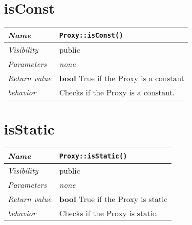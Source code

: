  \section{isConst}
\begin{longtable}{p{3cm} @{\hskip 1cm} p{12cm}}
 \hline
\textit{Name} & \texttt{Proxy::isConst()}\\
\hline
 \textit{Visibility} & public\\
\hline
\textit{Parameters} & \textit{none}\\
\hline
\textit{Return value} & \textbf{ bool} True if the Proxy is a constant \\
  \hline
 \textit{behavior} & Checks if the Proxy is a constant. \\
\hline
\end{longtable} \pagebreak
 \section{isStatic}
\begin{longtable}{p{3cm} @{\hskip 1cm} p{12cm}}
 \hline
\textit{Name} & \texttt{Proxy::isStatic()}\\
\hline
 \textit{Visibility} & public\\
\hline
\textit{Parameters} & \textit{none}\\
\hline
\textit{Return value} & \textbf{ bool} True if the Proxy is static \\
  \hline
 \textit{behavior} & Checks if the Proxy is static. \\
\hline
\end{longtable} \pagebreak
 